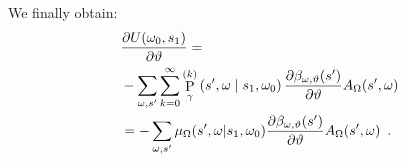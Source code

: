 \documentclass[letterpaper]{article}
\def\given{\;\middle\vert\;}
\DeclareMathOperator{\prob}{P}
\def\options{\Omega}
\def\option{\omega}
\def\termparams{\vartheta}
\begin{document}
 We finally obtain:
\begin{align*}
&\deriv[U(\omega_0, s_1)]{\vartheta} = \\
&-\sum_{\option, s'} \sum_{k=0}^\infty  \prob_\gamma^{(k)}\left(s', \option \given s_1, \omega_0 \right) \deriv[\beta_{\option, \termparams}(s')]{\termparams} A_\options(s', \option) \\
&=-\sum_{\option, s'} \mu_\Omega(s', \omega | s_1, \omega_0) \deriv[\beta_{\option, \termparams}(s')]{\termparams} A_\options(s', \option) \enspace.
\end{align*}


 
 
\end{document}
